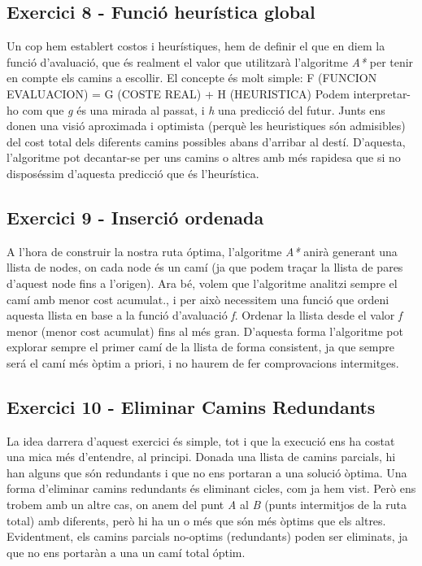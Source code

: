 \documentclass[a4paper,12pt]{article}
\begin{document}
        \subsection{Exercici 8 - Funció heurística global}

        Un cop hem establert costos i heurístiques, hem de definir el que en diem la funció d'avaluació, que és realment el valor que utilitzarà l’algoritme \textit{A*} per tenir en compte els camins a escollir. El concepte és molt simple: F (FUNCION EVALUACION) = G (COSTE REAL) + H (HEURISTICA) 
        Podem interpretar-ho com que \textit{g} és una mirada al passat, i \textit{h} una predicció del futur. Junts ens donen una visió aproximada i optimista (perquè les heuristiques són admisibles) del cost total dels diferents camins possibles abans d’arribar al destí. D’aquesta, l’algoritme pot decantar-se per uns camins o altres amb més rapidesa que si no disposéssim d’aquesta predicció que és l’heurística.

        \subsection{Exercici 9 - Inserció ordenada}

            A l’hora de construir la nostra ruta óptima, l’algoritme \textit{A*} anirà generant una llista de nodes, on cada node és un camí (ja que podem traçar la llista de pares d’aquest node fins a l’origen). Ara bé, volem que l’algoritme analitzi sempre el camí amb menor cost acumulat., i per això necessitem una funció que ordeni aquesta llista en base a la funció d’avaluació \textit{f}.
            Ordenar la llista desde el valor \textit{f} menor (menor cost acumulat) fins al més gran.
            D’aquesta forma l’algoritme pot explorar sempre el primer camí de la llista de forma consistent, ja que sempre será el camí més òptim a priori, i no haurem de fer comprovacions intermitges.
        

        \subsection{Exercici 10 - Eliminar Camins Redundants}
        
            La idea darrera d’aquest exercici és simple, tot i que la execució ens ha costat una mica més d’entendre, al principi. Donada una llista de camins parcials, hi han alguns que són redundants i que no ens portaran a una solució òptima. Una forma d’eliminar camins redundants és eliminant cicles, com ja hem vist. Però ens trobem amb un altre cas, on anem del punt \textit{A} al \textit{B} (punts intermitjos de la ruta total) amb diferents, però hi ha un o més que són més òptims que els altres. Evidentment, els camins parcials no-optims (redundants) poden ser eliminats, ja que no ens portaràn a una un camí total óptim.
\end{document}
